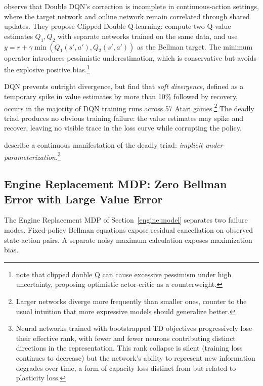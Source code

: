 \citet{fujimoto2018td3} observe that Double DQN's correction is incomplete in continuous-action settings, where the target network and online network remain correlated through shared updates. They propose Clipped Double Q-learning: compute two Q-value estimates $Q_1, Q_2$ with separate networks trained on the same data, and use $y = r + \gamma \min(Q_1(s',a'), Q_2(s',a'))$ as the Bellman target. The minimum operator introduces pessimistic underestimation, which is conservative but avoids the explosive positive bias.\footnote{\citet{Ciosek2019} note that clipped double Q can cause excessive pessimism under high uncertainty, proposing optimistic actor-critic as a counterweight.}

DQN prevents outright divergence, but \citet{vanHasselt2018} find that \emph{soft divergence}, defined as a temporary spike in value estimates by more than 10\% followed by recovery, occurs in the majority of DQN training runs across 57 Atari games.\footnote{Larger networks diverge more frequently than smaller ones, counter to the usual intuition that more expressive models should generalize better.} The deadly triad produces no obvious training failure: the value estimates may spike and recover, leaving no visible trace in the loss curve while corrupting the policy.

\citet{KumarImplicit2021} describe a continuous manifestation of the deadly triad: \emph{implicit under-parameterization}.\footnote{Neural networks trained with bootstrapped TD objectives progressively lose their effective rank, with fewer and fewer neurons contributing distinct directions in the representation. This rank collapse is silent (training loss continues to decrease) but the network's ability to represent new information degrades over time, a form of capacity loss distinct from but related to plasticity loss.}

\FloatBarrier
\subsection{Engine Replacement MDP: Zero Bellman Error with Large Value Error}
\label{engine:ch03b}

The Engine Replacement MDP of Section~\ref{engine:model} separates two failure modes. Fixed-policy Bellman equations expose residual cancellation on observed state-action pairs. A separate noisy maximum calculation exposes maximization bias.



